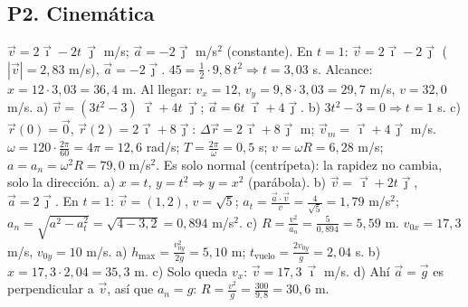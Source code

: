 \documentclass[11pt,a4paper]{article}
\newcommand{\ii}{\vec{\imath}}
\newcommand{\jj}{\vec{\jmath}}
\begin{document}
\subsection*{P2. Cinemática}
\begin{enumerate}[leftmargin=1.4cm,itemsep=4pt]
 $\vec v=2\ii-2t\,\jj$ m/s; $\vec a=-2\jj$ m/s$^2$ (constante). En $t=1$: $\vec v=2\ii-2\jj$ ($|\vec v|=2{,}83$ m/s), $\vec a=-2\jj$.
 $45=\frac12\cdot9{,}8\,t^2\Rightarrow t=3{,}03$ s. Alcance: $x=12\cdot3{,}03=36{,}4$ m. Al llegar: $v_x=12$, $v_y=9{,}8\cdot3{,}03=29{,}7$ m/s, $v=32{,}0$ m/s.
 a) $\vec v=(3t^2-3)\,\ii+4t\,\jj$; $\vec a=6t\,\ii+4\jj$. b) $3t^2-3=0\Rightarrow t=1$ s. c) $\vec r(0)=\vec 0$, $\vec r(2)=2\ii+8\jj$: $\Delta\vec r=2\ii+8\jj$ m; $\vec v_m=\ii+4\jj$ m/s.
 $\omega=120\cdot\frac{2\pi}{60}=4\pi=12{,}6$ rad/s; $T=\frac{2\pi}{\omega}=0{,}5$ s; $v=\omega R=6{,}28$ m/s; $a=a_n=\omega^2R=79{,}0$ m/s$^2$. Es solo normal (centrípeta): la rapidez no cambia, solo la dirección.
 a) $x=t$, $y=t^2\Rightarrow y=x^2$ (parábola). b) $\vec v=\ii+2t\jj$, $\vec a=2\jj$. En $t=1$: $\vec v=(1,2)$, $v=\sqrt5$; $a_t=\frac{\vec a\cdot\vec v}{v}=\frac{4}{\sqrt5}=1{,}79$ m/s$^2$; $a_n=\sqrt{a^2-a_t^2}=\sqrt{4-3{,}2}=0{,}894$ m/s$^2$. c) $R=\frac{v^2}{a_n}=\frac{5}{0{,}894}=5{,}59$ m.
 $v_{0x}=17{,}3$ m/s, $v_{0y}=10$ m/s. a) $h_{\max}=\frac{v_{0y}^2}{2g}=5{,}10$ m; $t_{\text{vuelo}}=\frac{2v_{0y}}{g}=2{,}04$ s. b) $x=17{,}3\cdot2{,}04=35{,}3$ m. c) Solo queda $v_x$: $\vec v=17{,}3\,\ii$ m/s. d) Ahí $\vec a=\vec g$ es perpendicular a $\vec v$, así que $a_n=g$: $R=\frac{v^2}{g}=\frac{300}{9{,}8}=30{,}6$ m.
\end{enumerate}
\end{document}
